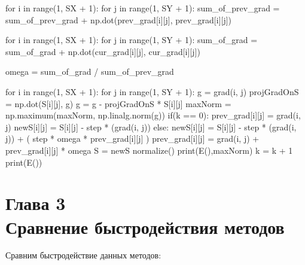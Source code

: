 \documentclass[ 12pt,x11names]{article}
\begin{document}
\begin{python}
    for i in range(1, SX + 1):
        for j in range(1, SY + 1):
            sum_of_prev_grad = sum_of_prev_grad + np.dot(prev_grad[i][j], prev_grad[i][j])

    for i in range(1, SX + 1):
        for j in range(1, SY + 1):
            sum_of_grad = sum_of_grad + np.dot(cur_grad[i][j], cur_grad[i][j])

    omega = sum_of_grad / sum_of_prev_grad

    for i in range(1, SX + 1):
        for j in range(1, SY + 1):
            g = grad(i,  j)
            projGradOnS = np.dot(S[i][j], g)
            g = g - projGradOnS * S[i][j]
            maxNorm = np.maximum(maxNorm, np.linalg.norm(g))
            if(k == 0):
                prev_grad[i][j] = grad(i, j)
                newS[i][j] = S[i][j] - step * (grad(i, j))
            else:
                newS[i][j] = S[i][j] - step * (grad(i, j)) + ( step * omega *  prev_grad[i][j] )
                prev_grad[i][j] = grad(i, j) + prev_grad[i][j] * omega
    S = newS
    normalize()
    print(E(),maxNorm)
    k = k + 1
print(E())

 \end{python}

\newpage
\section{Глава 3\\
Сравнение быстродействия методов}
 Сравним быстродействие данных методов:\\
 \\
 \\
\end{document}

